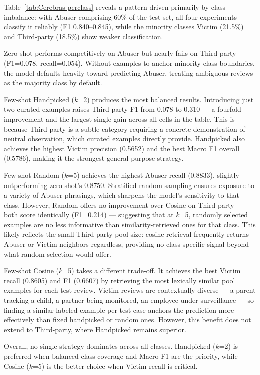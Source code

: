 \documentclass[12pt]{article}
\begin{document}
Table~\ref{tab:Cerebras-perclass} reveals a pattern driven primarily by class imbalance: 
with Abuser comprising 60\% of the test set, all four experiments classify it reliably (F1 0.840--0.845), 
while the minority classes Victim (21.5\%) and Third-party (18.5\%) show weaker classification.

Zero-shot performs competitively on Abuser but nearly fails on Third-party (F1=0.078, recall=0.054). 
Without examples to anchor minority class boundaries, the model defaults heavily toward predicting
 Abuser, treating ambiguous reviews as the majority class by default.

Few-shot Handpicked ($k$=2) produces the most balanced results. Introducing just two curated examples 
raises Third-party F1 from 0.078 to 0.310 — a fourfold improvement and the largest single gain 
across all cells in the table. This is because Third-party is a subtle category requiring a concrete 
demonstration of neutral observation, which curated examples directly provide. Handpicked also achieves 
the highest Victim precision (0.5652) and the best Macro F1 overall (0.5786), making it the strongest 
general-purpose strategy.

Few-shot Random ($k$=5) achieves the highest Abuser recall (0.8833), slightly outperforming 
zero-shot's 0.8750. Stratified random sampling ensures exposure to a variety of Abuser phrasings, 
which sharpens the model's sensitivity to that class. However, Random offers no improvement over Cosine 
on Third-party — both score identically (F1=0.214) — suggesting that at $k$=5, randomly selected 
examples are no less informative than similarity-retrieved ones for that class. This likely 
reflects the small Third-party pool size: cosine retrieval frequently returns Abuser or Victim 
neighbors regardless, providing no class-specific signal beyond what random selection would offer.

Few-shot Cosine ($k$=5) takes a different trade-off. It achieves the best Victim recall 
(0.8605) and F1 (0.6607) by retrieving the most lexically similar pool examples for each test 
review. Victim reviews are contextually diverse — a parent tracking a child, a partner being 
monitored, an employee under surveillance — so finding a similar labeled example per test 
case anchors the prediction more effectively than fixed handpicked or random ones. However, 
this benefit does not extend to Third-party, where Handpicked remains superior.

Overall, no single strategy dominates across all classes. Handpicked ($k$=2) is preferred when 
balanced class coverage and Macro F1 are the priority, while Cosine ($k$=5) is the better choice 
when Victim recall is critical.
\end{document}
